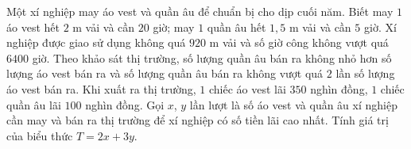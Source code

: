 \begin{ex}
Một xí nghiệp may áo vest và quần âu để chuẩn bị cho dịp cuối năm. Biết may $1$ áo vest hết $2$ m vải và cần $20$ giờ; may $1$ quần âu hết $1{,}5$ m vải và cần $5$ giờ. Xí nghiệp được giao sử dụng không quá $920$ m vải và số giờ công không vượt quá $6400$ giờ. Theo khảo sát thị trường, số lượng quần âu bán ra không nhỏ hơn số lượng áo vest bán ra và số lượng quần âu bán ra không vượt quá $2$ lần số lượng áo vest bán ra. Khi xuất ra thị trường, $1$ chiếc áo vest lãi $350$ nghìn đồng, $1$ chiếc quần âu lãi $100$ nghìn đồng. Gọi $x$, $y$ lần lượt là số áo vest và quần âu xí nghiệp cần may và bán ra thị trường để xí nghiệp có số tiền lãi cao nhất. Tính giá trị của biểu thức $T=2x+3y$.
\end{ex}
